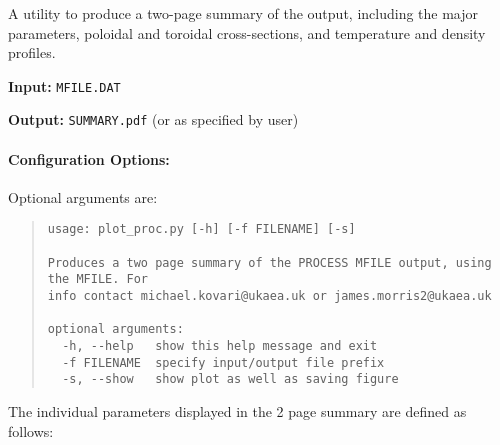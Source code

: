 \documentclass[11pt,a4paper]{article}
\newcommand{\mfile}{\mbox{\texttt{MFILE.DAT}}}
\begin{document}
A utility to produce a two-page summary of the output, including the major
parameters, poloidal and toroidal cross-sections, and temperature and density profiles.

\begin{description}
\item{\textbf{Input:}}
 \mfile

\item{\textbf{Output:}}
\verb|SUMMARY.pdf| (or as specified by user)
\end{description}

\paragraph{Configuration Options:}

Optional arguments are:
\begin{quote}
\begin{verbatim}
usage: plot_proc.py [-h] [-f FILENAME] [-s]

Produces a two page summary of the PROCESS MFILE output, using the MFILE. For
info contact michael.kovari@ukaea.uk or james.morris2@ukaea.uk

optional arguments:
  -h, --help   show this help message and exit
  -f FILENAME  specify input/output file prefix
  -s, --show   show plot as well as saving figure
\end{verbatim}
\end{quote}

The individual parameters displayed in the 2 page summary are defined as follows:
\end{document}
